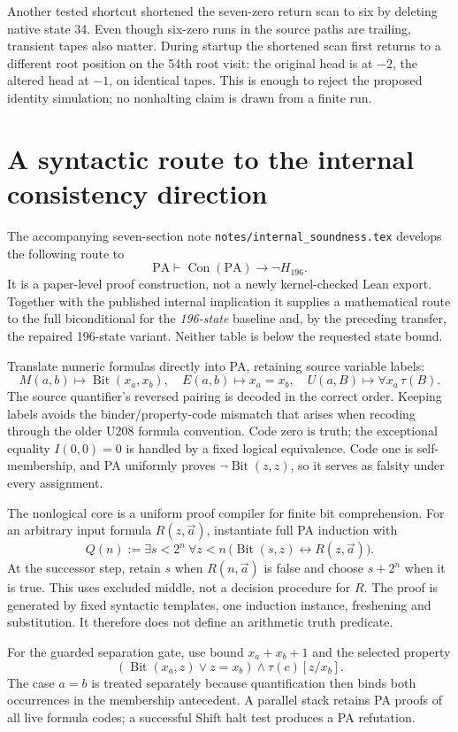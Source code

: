 \documentclass[11pt,letterpaper]{article}
\newcommand{\PA}{\mathrm{PA}}
\newcommand{\Con}{\operatorname{Con}}
\newcommand{\Bit}{\operatorname{Bit}}
\newcommand{\file}[1]{\texttt{\nolinkurl{#1}}}
\begin{document}
Another tested shortcut shortened the seven-zero return scan to six by
deleting native state 34. Even though six-zero runs in the source paths
are trailing, transient tapes also matter. During startup the shortened
scan first returns to a different root position on the 54th root visit:
the original head is at $-2$, the altered head at $-1$, on identical tapes.
This is enough to reject the proposed identity simulation; no nonhalting
claim is drawn from a finite run.

\section{A syntactic route to the internal consistency direction}

The accompanying seven-section note
\file{notes/internal_soundness.tex} develops the following route to
\[
        \PA\vdash\Con(\PA)\to\neg H_{196}.
\]
It is a paper-level proof construction, not a newly kernel-checked Lean
export. Together with the published internal implication it supplies a
mathematical route to the full biconditional for the \emph{196-state}
baseline and, by the preceding transfer, the repaired 196-state variant.
Neither table is below the requested state bound.

Translate numeric formulas directly into PA, retaining source variable
labels:
\[
 M(a,b)\mapsto\Bit(x_a,x_b),\quad E(a,b)\mapsto x_a=x_b,
 \quad U(a,B)\mapsto\forall x_a\,\tau(B).
\]
The source quantifier's reversed pairing is decoded in the correct order.
Keeping labels avoids the binder/property-code mismatch that arises when
recoding through the older U208 formula convention. Code zero is truth;
the exceptional equality $I(0,0)=0$ is handled by a fixed logical
equivalence. Code one is self-membership, and PA uniformly proves
$\neg\Bit(z,z)$, so it serves as falsity under every assignment.

The nonlogical core is a uniform proof compiler for finite bit
comprehension. For an arbitrary input formula $R(z,\vec a)$, instantiate
full PA induction with
\[
 Q(n):=\exists s<2^n\ \forall z<n\,
                  \bigl(\Bit(s,z)\leftrightarrow R(z,\vec a)\bigr).
\]
At the successor step, retain $s$ when $R(n,\vec a)$ is false and choose
$s+2^n$ when it is true. This uses excluded middle, not a decision procedure
for $R$. The proof is generated by fixed syntactic templates, one induction
instance, freshening and substitution. It therefore does not define an
arithmetic truth predicate.

For the guarded separation gate, use bound $x_a+x_b+1$ and the selected
property
\[
 (\Bit(x_a,z)\vee z=x_b)\wedge\tau(c)[z/x_b].
\]
The case $a=b$ is treated separately because quantification then binds
both occurrences in the membership antecedent. A parallel stack retains
PA proofs of all live formula codes; a successful Shift halt test produces
a PA refutation.
\end{document}

